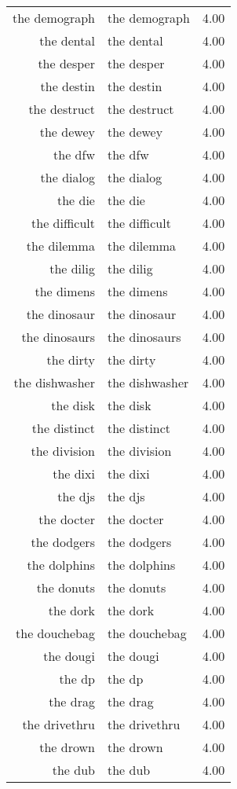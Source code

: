\begin{table}[ht]
\begin{tabular}{rlr}
  the demograph & the demograph & 4.00 \\ 
  the dental & the dental & 4.00 \\ 
  the desper & the desper & 4.00 \\ 
  the destin & the destin & 4.00 \\ 
  the destruct & the destruct & 4.00 \\ 
  the dewey & the dewey & 4.00 \\ 
  the dfw & the dfw & 4.00 \\ 
  the dialog & the dialog & 4.00 \\ 
  the die & the die & 4.00 \\ 
  the difficult & the difficult & 4.00 \\ 
  the dilemma & the dilemma & 4.00 \\ 
  the dilig & the dilig & 4.00 \\ 
  the dimens & the dimens & 4.00 \\ 
  the dinosaur & the dinosaur & 4.00 \\ 
  the dinosaurs & the dinosaurs & 4.00 \\ 
  the dirty & the dirty & 4.00 \\ 
  the dishwasher & the dishwasher & 4.00 \\ 
  the disk & the disk & 4.00 \\ 
  the distinct & the distinct & 4.00 \\ 
  the division & the division & 4.00 \\ 
  the dixi & the dixi & 4.00 \\ 
  the djs & the djs & 4.00 \\ 
  the docter & the docter & 4.00 \\ 
  the dodgers & the dodgers & 4.00 \\ 
  the dolphins & the dolphins & 4.00 \\ 
  the donuts & the donuts & 4.00 \\ 
  the dork & the dork & 4.00 \\ 
  the douchebag & the douchebag & 4.00 \\ 
  the dougi & the dougi & 4.00 \\ 
  the dp & the dp & 4.00 \\ 
  the drag & the drag & 4.00 \\ 
  the drivethru & the drivethru & 4.00 \\ 
  the drown & the drown & 4.00 \\ 
  the dub & the dub & 4.00 \\ 

\end{tabular}
\end{table}
